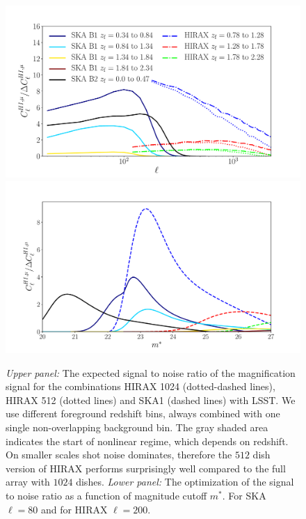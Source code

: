 \documentclass[useAMS,usenatbib]{mnras}
\begin{document}
\begin{figure}
\centering\includegraphics[width=.99\columnwidth]{S2N_SKA_HIRAX.pdf}
\centering\includegraphics[width=0.99\columnwidth]{S2N_of_mstar.pdf}
\captionsetup{width=0.95\linewidth}
\caption{{\sl Upper panel:} The expected signal to noise ratio of the magnification signal for the combinations HIRAX 1024 (dotted-dashed lines), HIRAX 512 (dotted lines) and SKA1 (dashed lines) with LSST. We use different foreground redshift bins, always combined with one single non-overlapping background bin. The gray shaded area indicates the start of nonlinear regime, which depends on redshift. On smaller scales shot noise dominates, therefore the $512$ dish version of HIRAX performs surprisingly well compared to the full array with $1024$ dishes.
{\sl Lower panel:} The optimization of the signal to noise ratio as a function of magnitude cutoff $m^*$. For SKA $\ell = 80$ and for HIRAX $\ell = 200$.}
\captionsetup{width=.9\linewidth}
\label{fig:S2N}
\label{fig:S2Nmstar}
\end{figure}

\end{document}
